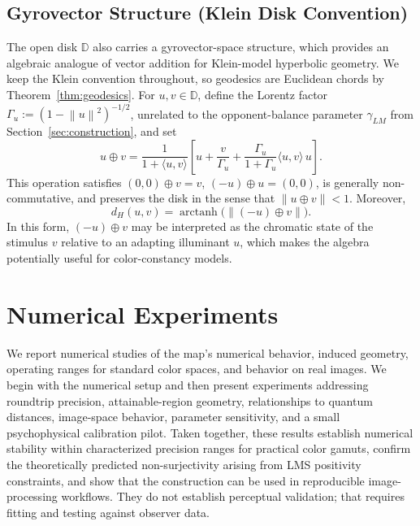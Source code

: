 \documentclass[11pt]{article}
\theoremstyle{plain}
\theoremstyle{definition}
\theoremstyle{remark}
\newcommand{\D}{\mathbb{D}}
\newcommand{\norm}[1]{\left\lVert #1 \right\rVert}
\newcommand{\inner}[2]{\langle #1, #2 \rangle}
\DeclareMathOperator{\arctanh}{arctanh}
\begin{document}
\subsection{Gyrovector Structure (Klein Disk Convention)}
\label{sec:gyrovector}

The open disk $\D$ also carries a gyrovector-space structure, which provides an algebraic analogue of vector addition for Klein-model hyperbolic geometry. We keep the Klein convention throughout, so geodesics are Euclidean chords by Theorem~\ref{thm:geodesics}. For $u, v \in \D$, define the Lorentz factor $\Gamma_u := (1 - \norm{u}^2)^{-1/2}$, unrelated to the opponent-balance parameter $\gamma_{LM}$ from Section~\ref{sec:construction}, and set
\begin{equation}
\boxed{
u \oplus v = \frac{1}{1 + \inner{u}{v}} \left[ u + \frac{v}{\Gamma_u} + \frac{\Gamma_u}{1 + \Gamma_u}\inner{u}{v} \, u \right].
}
\end{equation}
This operation satisfies $(0,0) \oplus v = v$, $(-u) \oplus u = (0,0)$, is generally non-commutative, and preserves the disk in the sense that $\norm{u \oplus v} < 1$. Moreover,
\begin{equation}
d_H(u, v) = \arctanh\bigl(\norm{(-u) \oplus v}\bigr).
\end{equation}
In this form, $(-u) \oplus v$ may be interpreted as the chromatic state of the stimulus $v$ relative to an adapting illuminant $u$, which makes the algebra potentially useful for color-constancy models.

\section{Numerical Experiments}
\label{sec:results}

We report numerical studies of the map's numerical behavior, induced geometry, operating ranges for standard color spaces, and behavior on real images. We begin with the numerical setup and then present experiments addressing roundtrip precision, attainable-region geometry, relationships to quantum distances, image-space behavior, parameter sensitivity, and a small psychophysical calibration pilot. Taken together, these results establish numerical stability within characterized precision ranges for practical color gamuts, confirm the theoretically predicted non-surjectivity arising from LMS positivity constraints, and show that the construction can be used in reproducible image-processing workflows. They do not establish perceptual validation; that requires fitting and testing against observer data.
\end{document}
